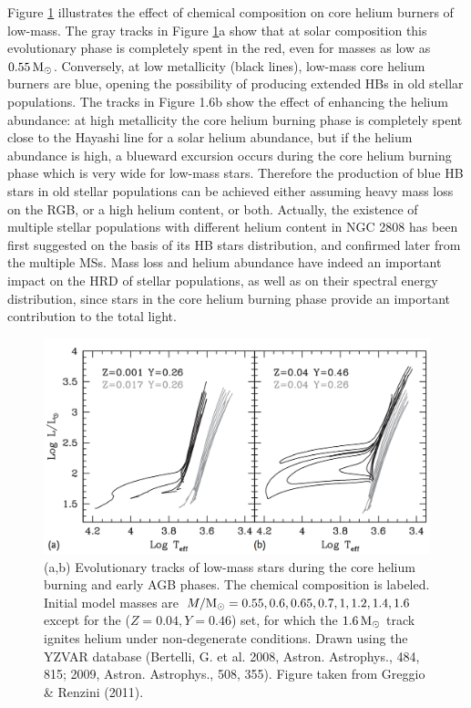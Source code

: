 \documentclass[a4paper,10pt]{article}
\begin{document}
{\noindent}Figure \ref{fig:hrdz_low} illustrates the effect of chemical composition on core helium burners of low-mass. The gray tracks in Figure \ref{fig:hrdz_low}a show that at solar composition this evolutionary phase is completely spent in the red, even for masses as low as $0.55\,{\rm M_\odot}$. Conversely, at low metallicity (black lines), low-mass core helium burners are blue, opening the possibility of producing extended HBs in old stellar populations. The tracks in Figure 1.6b show the effect of enhancing the helium abundance: at high metallicity the core helium burning phase is completely spent close to the Hayashi line for a solar helium abundance, but if the helium abundance is high, a blueward excursion occurs during the core helium burning phase which is very wide for low-mass stars. Therefore the production of blue HB stars in old stellar populations can be achieved either assuming heavy mass loss on the RGB, or a high helium content, or both. Actually, the existence of multiple stellar populations with different helium content in NGC 2808 has been first suggested on the basis of its HB stars distribution, and confirmed later from the multiple MSs. Mass loss and helium abundance have indeed an important impact on the HRD of stellar populations, as well as on their spectral energy distribution, since stars in the core helium burning phase provide an important contribution to the total light.

\begin{figure}[t]
    \centering
    \includegraphics[width=12cm]{figures/HRD_Z_low.png}
    \caption{\footnotesize{(a,b) Evolutionary tracks of low-mass stars during the core helium burning and early AGB phases. The chemical composition is labeled. Initial model masses are $M/{\rm M_\odot}=0.55,0.6,0.65,0.7,1,1.2,1.4,1.6$ except for the ($Z=0.04,Y=0.46$) set, for which the $1.6\,{\rm M_\odot}$ track ignites helium under non-degenerate conditions. Drawn using the YZVAR database (Bertelli, G. et al. 2008, Astron. Astrophys., 484, 815; 2009, Astron. Astrophys., 508, 355). Figure taken from Greggio \& Renzini (2011).}}
    \label{fig:hrdz_low}
\end{figure}
\end{document}
